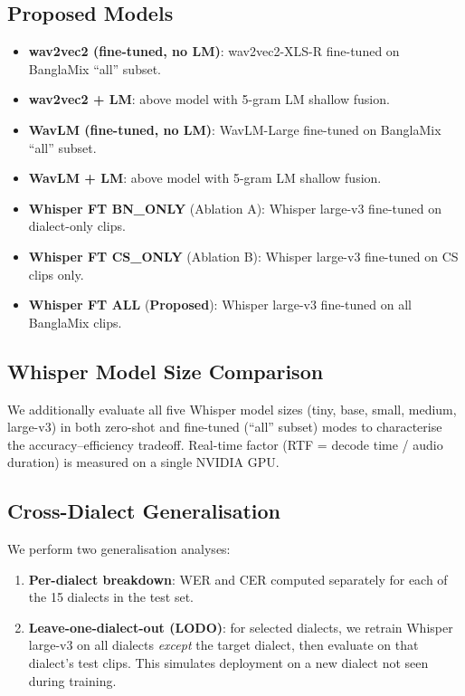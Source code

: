 \subsection{Proposed Models}

\begin{itemize}[leftmargin=*, itemsep=2pt]
  \item \textbf{wav2vec2 (fine-tuned, no LM)}: wav2vec2-XLS-R fine-tuned on
        BanglaMix ``all'' subset.
  \item \textbf{wav2vec2 + LM}: above model with 5-gram LM shallow fusion.
  \item \textbf{WavLM (fine-tuned, no LM)}: WavLM-Large fine-tuned on
        BanglaMix ``all'' subset.
  \item \textbf{WavLM + LM}: above model with 5-gram LM shallow fusion.
  \item \textbf{Whisper FT BN\_ONLY} (Ablation A): Whisper large-v3 fine-tuned
        on dialect-only clips.
  \item \textbf{Whisper FT CS\_ONLY} (Ablation B): Whisper large-v3 fine-tuned
        on CS clips only.
  \item \textbf{Whisper FT ALL} (\textbf{Proposed}): Whisper large-v3 fine-tuned
        on all BanglaMix clips.
\end{itemize}

\subsection{Whisper Model Size Comparison}

We additionally evaluate all five Whisper model sizes (tiny, base, small,
medium, large-v3) in both zero-shot and fine-tuned (``all'' subset) modes
to characterise the accuracy--efficiency tradeoff.
Real-time factor (RTF = decode time / audio duration) is measured on a single
NVIDIA GPU.

\subsection{Cross-Dialect Generalisation}

We perform two generalisation analyses:
\begin{enumerate}[leftmargin=2em, itemsep=2pt]
  \item \textbf{Per-dialect breakdown}: WER and CER computed separately for
        each of the 15 dialects in the test set.
  \item \textbf{Leave-one-dialect-out (LODO)}: for selected dialects, we
        retrain Whisper large-v3 on all dialects \emph{except} the target
        dialect, then evaluate on that dialect's test clips.
        This simulates deployment on a new dialect not seen during training.
\end{enumerate}

